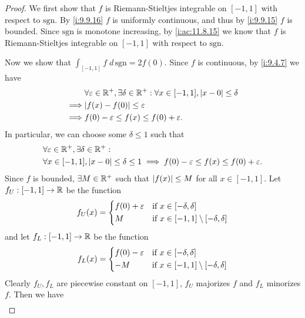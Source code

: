 \begin{proof}
  We first show that \(f\) is Riemann-Stieltjes integrable on \([-1, 1]\) with respect to \(\text{sgn}\).
  By \cref{i:9.9.16} \(f\) is uniformly continuous, and thus by \cref{i:9.9.15} \(f\) is bounded.
  Since \(\text{sgn}\) is monotone increasing, by \cref{i:ac:11.8.15} we know that \(f\) is Riemann-Stieltjes integrable on \([-1, 1]\) with respect to \(\text{sgn}\).

  Now we show that \(\int_{[-1, 1]} f \; d \, \text{sgn} = 2f(0)\).
  Since \(f\) is continuous, by \cref{i:9.4.7} we have
  \begin{align*}
             & \forall \varepsilon \in \R^+, \exists \delta \in \R^+ : \forall x \in [-1, 1], \abs{x - 0} \leq \delta \\
    \implies & \abs{f(x) - f(0)} \leq \varepsilon                                                                     \\
    \implies & f(0) - \varepsilon \leq f(x) \leq f(0) + \varepsilon.
  \end{align*}
  In particular, we can choose some \(\delta \leq 1\) such that
  \begin{align*}
     & \forall \varepsilon \in \mathbb{R}^+, \exists \delta \in \mathbb{R}^+ :                                                              \\
     & \forall x \in [-1, 1], \left\lvert x - 0\right\rvert \leq \delta \leq 1 \implies f(0) - \varepsilon \leq f(x) \leq f(0) + \varepsilon.
  \end{align*}
  Since \(f\) is bounded, \(\exists M \in \mathbb{R}^+\) such that \(\left\lvert f(x)\right\rvert \leq M\) for all \(x \in [-1, 1]\).
  Let \(f_U : [-1, 1] \to \mathbb{R}\) be the function
  \[
    f_U(x) = \begin{dcases}
      f(0) + \varepsilon & \text{if } x \in [-\delta, \delta]                   \\
      M                  & \text{if } x \in [-1, 1] \setminus [-\delta, \delta]
    \end{dcases}
  \]
  and let \(f_L : [-1, 1] \to \mathbb{R}\) be the function
  \[
    f_L(x) = \begin{dcases}
      f(0) - \varepsilon & \text{if } x \in [-\delta, \delta]                   \\
      -M                 & \text{if } x \in [-1, 1] \setminus [-\delta, \delta]
    \end{dcases}
  \]
  Clearly \(f_U, f_L\) are piecewise constant on \([-1, 1]\), \(f_U\) majorizes \(f\) and \(f_L\) minorizes \(f\).
  Then we have
  \begin{align*}

\end{align*}
\end{proof}
